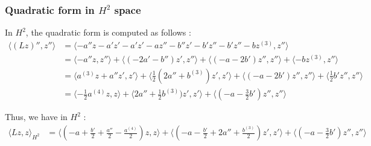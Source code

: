 \documentclass[11pt,a4paper]{article}
\begin{document}
\subsubsection{Quadratic form in $H^2$ space}
In $H^2$, the quadratic form is computed as follows :
\begin{align*}
  \langle (Lz)'', z'' \rangle   &=    \langle -a''z-a'z'-a'z'-az''- b''z'-b'z''-b'z''-bz^{(3)}, z'' \rangle \\
  &= \langle -a''z, z'' \rangle +  \langle (-2a'- b'')z', z'' \rangle +  \langle (-a-2b')z'', z'' \rangle + \langle -bz^{(3)}, z'' \rangle \\
  &= \langle a^{(3)}z+ a''z', z' \rangle +  \langle \frac{1}{2} (2a''+ b^{(3)})z', z' \rangle +  \langle (-a-2b')z'', z'' \rangle + \langle \frac{1}{2} b'z'', z'' \rangle \\
  &= \langle - \frac{1}{2}a^{(4)}z, z \rangle +  \langle 2a''+ \frac{1}{2} b^{(3)})z', z' \rangle +  \langle (-a- \frac{3}{2} b')z'', z'' \rangle 
\end{align*}

Thus, we have in $H^2$ :
\begin{align*}
  \langle Lz, z \rangle_{H^2}   &=  \langle (-a+ \frac{b'}{2}+\frac{a''}{2}-\frac{a^{(4)}}{2})z, z \rangle +  \langle (-a-\frac{b'}{2} +2a''+ \frac{ b^{(3)}}{2})z', z' \rangle +  \langle (-a- \frac{3}{2} b')z'', z'' \rangle 
\end{align*}
\end{document}

